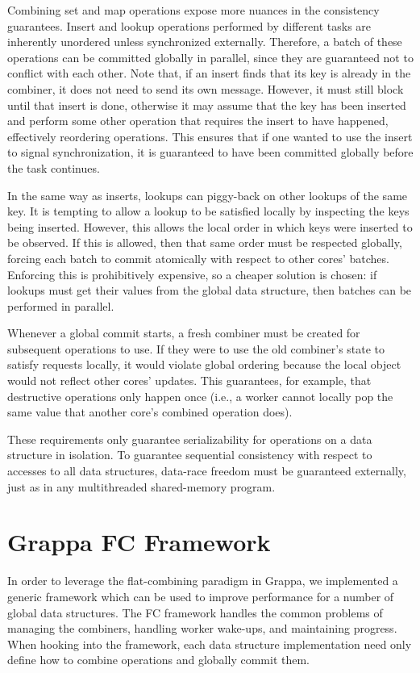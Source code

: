 Combining set and map operations expose more nuances in the consistency guarantees.
Insert and lookup operations performed by different tasks are inherently unordered unless synchronized externally.
Therefore, a batch of these operations can be committed globally in parallel, since they are guaranteed not to conflict with each other.
Note that, if an insert finds that its key is already in the combiner, it does not need to send its own message. However, it must still block until that insert is done, otherwise it may assume that the key has been inserted and perform some other operation that requires the insert to have happened, effectively reordering operations.
This ensures that if one wanted to use the insert to signal synchronization, it is guaranteed to have been committed globally before the task continues.

In the same way as inserts, lookups can piggy-back on other lookups of the same key.
It is tempting to allow a lookup to be satisfied locally by inspecting the keys being inserted.
However, this allows the local order in which keys were inserted to be observed.
If this is allowed, then that same order must be respected globally, forcing each batch to commit atomically with respect to other cores' batches. Enforcing this is prohibitively expensive, so a cheaper solution is chosen: if lookups must get their values from the global data structure, then batches can be performed in parallel.

Whenever a global commit starts, a fresh combiner must be created for subsequent operations to use. If they were to use the old combiner's state to satisfy requests locally, it would violate global ordering because the local object would not reflect other cores' updates. This guarantees, for example, that destructive operations only happen once (i.e., a worker cannot locally pop the same value that another core's combined operation does).

These requirements only guarantee serializability for operations on a data structure in isolation. To guarantee sequential consistency with respect to accesses to all data structures, data-race freedom  must be guaranteed externally, just as in any multithreaded shared-memory program.

\section{Grappa FC Framework}
In order to leverage the flat-combining paradigm in Grappa, we implemented a generic framework which can be used to improve performance for a number of global data structures. The FC framework handles the common problems of managing the combiners, handling worker wake-ups, and maintaining progress. When hooking into the framework, each data structure implementation need only define how to combine operations and globally commit them.

